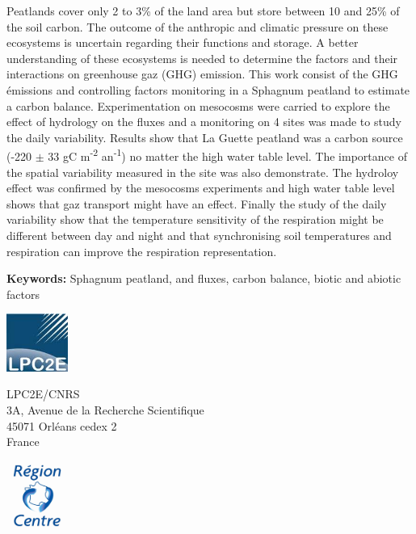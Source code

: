 {\begin{framed}
	\begin{minipage}{\dimexpr\textwidth-2\fboxrule-2\fboxsep}
	Peatlands cover only 2 to 3\% of the land area but store between 10 and 25\% of the soil carbon.
	The outcome of the anthropic and climatic pressure on these ecosystems is uncertain regarding their functions and storage.
	A better understanding of these ecosystems is needed to determine the factors and their interactions on greenhouse gaz (GHG) emission.
	This work consist of the GHG émissions and controlling factors monitoring in a Sphagnum peatland to estimate a carbon balance.
	Experimentation on mesocosms were carried to explore the effect of hydrology on the fluxes and a monitoring on 4 sites was made to study the daily variability.
	Results show that La Guette peatland was a carbon source (-220 $\pm$ 33 gC m\textsuperscript{-2} an\textsuperscript{-1}) no matter the high water table level.
	The importance of the spatial variability measured in the site was also demonstrate.
	The hydroloy effect was confirmed by the mesocosms experiments and high water table level shows that gaz transport might have an effect. 
	Finally the study of the daily variability show that the temperature sensitivity of the respiration might be different between day and night and that synchronising soil temperatures and respiration can improve the respiration representation.

\textbf{Keywords:} Sphagnum peatland, \coo and \chh fluxes, carbon balance, biotic and abiotic factors
	\end{minipage} 
\end{framed}

\includegraphics[width=0.15\textwidth, valign=c]{./images/logos/LPC2E}
\hfill
\begin{minipage}{.5\textwidth}
\begin{center}
LPC2E/CNRS\\
3A, Avenue de la Recherche Scientifique\\
45071 Orléans cedex 2\\
France \\
\end{center}
\end{minipage}
\hfill
\includegraphics[width=0.15\textwidth, valign=c]{./images/logos/region_centre}

}